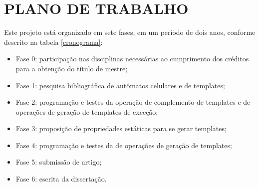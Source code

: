 \section{PLANO DE TRABALHO}
\label{sec:planoDeTrabalho}

Este projeto está organizado em sete fases, em um período de dois anos, conforme descrito na tabela \ref{cronograma}:

  \begin{itemize}
      \item Fase 0: participação nas disciplinas necessárias ao cumprimento dos créditos para a obtenção do título de mestre;
      \item Fase 1: pesquisa bibliográfica de autômatos celulares e de templates;
      \item Fase 2: programação e testes da operação de complemento de templates e de operações de geração de templates de exceção;
      \item Fase 3: proposição de propriedades estáticas para se gerar templates;
      \item Fase 4: programação e testes da de operações de geração de templates;
      \item Fase 5: submissão de artigo;
      \item Fase 6: escrita da dissertação.
  \end{itemize}

\begin{table}[h!]
\centering
\caption{Cronograma de desenvolvimento do projeto}
\label{cronograma}
\end{table}